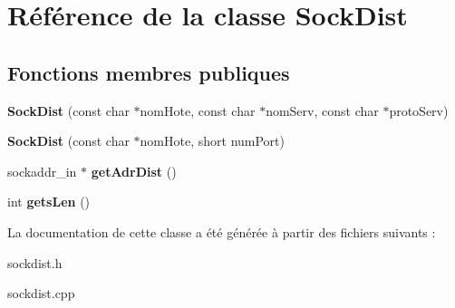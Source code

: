\hypertarget{class_sock_dist}{\section{Référence de la classe Sock\-Dist}
\label{class_sock_dist}
}
\subsection*{Fonctions membres publiques}
\begin{DoxyCompactItemize}
\item 
\hypertarget{class_sock_dist_a55e2989019f9fc7bd0626de2a799e98d}{{\bfseries Sock\-Dist} (const char $\ast$nom\-Hote, const char $\ast$nom\-Serv, const char $\ast$proto\-Serv)}\label{class_sock_dist_a55e2989019f9fc7bd0626de2a799e98d}

\item 
\hypertarget{class_sock_dist_acbf1f7f8e666ba9f00010aa037f9bc37}{{\bfseries Sock\-Dist} (const char $\ast$nom\-Hote, short num\-Port)}\label{class_sock_dist_acbf1f7f8e666ba9f00010aa037f9bc37}

\item 
\hypertarget{class_sock_dist_a03dfa728b21bfd0ab228a5a671a81648}{sockaddr\-\_\-in $\ast$ {\bfseries get\-Adr\-Dist} ()}\label{class_sock_dist_a03dfa728b21bfd0ab228a5a671a81648}

\item 
\hypertarget{class_sock_dist_afa8bbad9517c5f1941cd890495b296cf}{int {\bfseries gets\-Len} ()}\label{class_sock_dist_afa8bbad9517c5f1941cd890495b296cf}

\end{DoxyCompactItemize}


La documentation de cette classe a été générée à partir des fichiers suivants \-:\begin{DoxyCompactItemize}
\item 
sockdist.\-h\item 
sockdist.\-cpp\end{DoxyCompactItemize}

